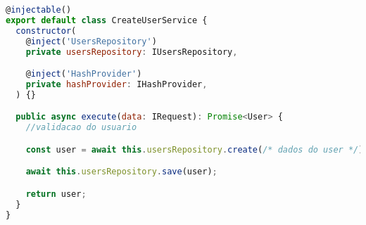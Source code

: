\begin{lstlisting}[language=JavaScript, caption={CreateUserService.ts},captionpos=b, label=alg:createuserservice]
@injectable()
export default class CreateUserService {
  constructor(
    @inject('UsersRepository')
    private usersRepository: IUsersRepository,

    @inject('HashProvider')
    private hashProvider: IHashProvider,
  ) {}

  public async execute(data: IRequest): Promise<User> {
    //validacao do usuario

    const user = await this.usersRepository.create(/* dados do user */);

    await this.usersRepository.save(user);

    return user;
  }
}
\end{lstlisting}